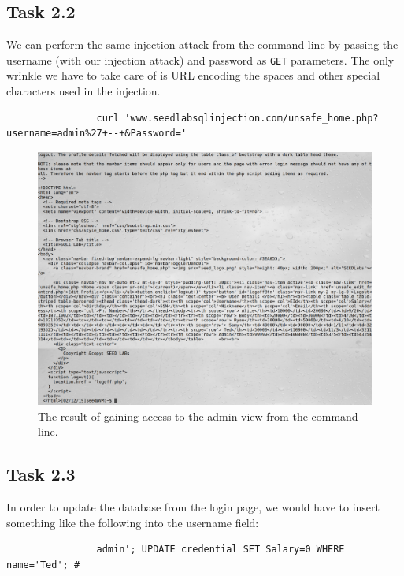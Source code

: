 \documentclass[12pt,letterpaper]{article}
\begin{document}
		\pagebreak
		
		\subsection*{Task 2.2}
			We can perform the same injection attack from the command line by passing the username (with our injection attack) and password as \texttt{GET} parameters. The only wrinkle we have to take care of is URL encoding the spaces and other special characters used in the injection.
		
			\begin{verbatim}
				curl 'www.seedlabsqlinjection.com/unsafe_home.php?username=admin%27+--+&Password='
			\end{verbatim}
		
			\begin{figure}[h!]
				\includegraphics[width=\linewidth]{task-2-2-curl}
				\caption{The result of gaining access to the admin view from the command line.}
			\end{figure}
		
		\pagebreak
		
		\subsection*{Task 2.3}
			In order to update the database from the login page, we would have to insert something like the following into the username field:
			
			\begin{verbatim}
				admin'; UPDATE credential SET Salary=0 WHERE name='Ted'; #
			\end{verbatim}
		
\end{document}

